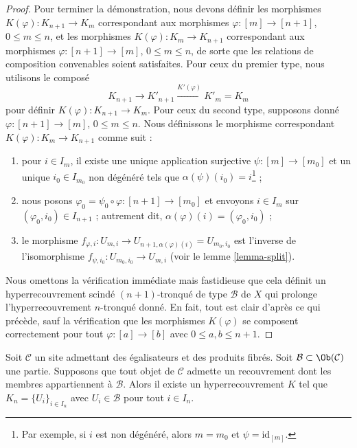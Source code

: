 \begin{proof}
\medskip\noindent
Pour terminer la démonstration, nous devons définir les morphismes
$K(\varphi) : K_{n + 1} \to K_m$ correspondant aux morphismes
$\varphi : [m] \to [n + 1]$, $0 \leq m \leq n$, et les morphismes
$K(\varphi) : K_m \to K_{n + 1}$ correspondant aux morphismes
$\varphi : [n + 1] \to [m]$, $0 \leq m \leq n$,
de sorte que les relations de composition convenables soient satisfaites.
Pour ceux du premier type, nous utilisons le composé
$$
K_{n + 1} \to K'_{n + 1} \xrightarrow{K'(\varphi)} K'_m = K_m
$$
pour définir $K(\varphi) : K_{n + 1} \to K_m$.
Pour ceux du second type, supposons donné $\varphi : [n + 1] \to [m]$,
$0 \leq m \leq n$. Nous définissons le morphisme correspondant
$K(\varphi) : K_m \to K_{n + 1}$ comme suit :
\begin{enumerate}
\item pour $i \in I_m$, il existe une unique application surjective
$\psi : [m] \to [m_0]$ et un unique $i_0 \in I_{m_0}$ non dégénéré
tels que $\alpha(\psi)(i_0) = i$\footnote{Par exemple, si $i$ est
non dégénéré, alors $m = m_0$ et $\psi = \text{id}_{[m]}$.} ;
\item nous posons $\varphi_0 = \psi_0 \circ \varphi : [n + 1] \to [m_0]$
et envoyons
$i \in I_m$ sur $(\varphi_0, i_0) \in I_{n + 1}$ ; autrement dit,
$\alpha(\varphi)(i) = (\varphi_0, i_0)$ ;
\item le morphisme
$f_{\varphi, i} : U_{m, i} \to U_{n + 1, \alpha(\varphi)(i)} = U_{m_0, i_0}$
est l'inverse de l'isomorphisme $f_{\psi, i_0} : U_{m_0, i_0} \to U_{m, i}$
(voir le lemme \ref{lemma-split}).
\end{enumerate}
Nous omettons la vérification immédiate mais fastidieuse que cela définit
un hyperrecouvrement scindé $(n + 1)$-tronqué de type $\mathcal{B}$ de $X$
qui prolonge l'hyperrecouvrement $n$-tronqué donné. En fait, tout est clair
d'après ce qui précède, sauf la vérification que les morphismes
$K(\varphi)$ se composent correctement pour tout $\varphi : [a] \to [b]$
avec $0 \leq a, b \leq n + 1$.
\end{proof}

\begin{lemma}
\label{lemma-hypercovering-site}
Soit $\mathcal{C}$ un site admettant des égalisateurs et des produits fibrés.
Soit $\mathcal{B} \subset \Ob(\mathcal{C})$ une partie. Supposons
que tout objet de $\mathcal{C}$ admette un recouvrement
dont les membres appartiennent à $\mathcal{B}$.
Alors il existe un hyperrecouvrement $K$ tel que
$K_n = \{U_i\}_{i \in I_n}$ avec $U_i \in \mathcal{B}$
pour tout $i \in I_n$.
\end{lemma}


